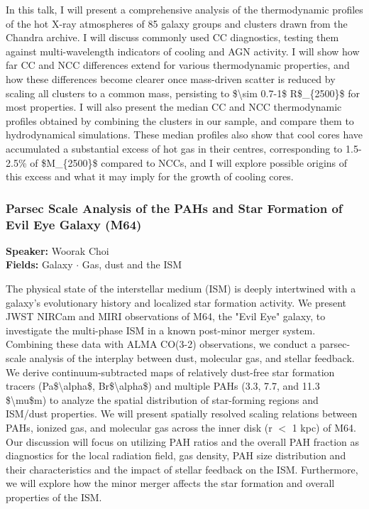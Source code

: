 In this talk, I will present a comprehensive analysis of the thermodynamic profiles of the hot X-ray atmospheres of 85 galaxy groups and clusters drawn from the Chandra archive. I will discuss commonly used CC diagnostics, testing them against multi-wavelength indicators of cooling and AGN activity. I will show how far CC and NCC differences extend for various thermodynamic properties, and how these differences become clearer once mass-driven scatter is reduced by scaling all clusters to a common mass, persisting to \$\textbackslash{}sim 0.7-1\$ R\$\_\{2500\}\$ for most properties. I will also present the median CC and NCC thermodynamic profiles obtained by combining the clusters in our sample, and compare them to hydrodynamical simulations. These median profiles also show that cool cores have accumulated a substantial excess of hot gas in their centres, corresponding to 1.5-2.5\% of \$M\_\{2500\}\$ compared to NCCs, and I will explore possible origins of this excess and what it may imply for the growth of cooling cores.

\hypertarget{abstract-talk-160}{}\label{abstract-page-talk-160}
\subsubsection*{Parsec Scale Analysis of the PAHs and Star Formation of Evil Eye Galaxy (M64)}
\textbf{Speaker:} Woorak Choi\\
\textbf{Fields:} Galaxy $\cdot$ Gas, dust and the ISM

The physical state of the interstellar medium (ISM) is deeply intertwined with a galaxy's evolutionary history and localized star formation activity. We present JWST NIRCam and MIRI observations of M64, the "Evil Eye" galaxy, to investigate the multi-phase ISM in a known post-minor merger system. Combining these data with ALMA CO(3-2) observations, we conduct a parsec-scale analysis of the interplay between dust, molecular gas, and stellar feedback. We derive continuum-subtracted maps of relatively dust-free star formation tracers (Pa\$\textbackslash{}alpha\$, Br\$\textbackslash{}alpha\$) and multiple PAHs (3.3, 7.7, and 11.3 \$\textbackslash{}mu\$m) to analyze the spatial distribution of star-forming regions and ISM/dust properties. We will present spatially resolved scaling relations between PAHs, ionized gas, and molecular gas across the inner disk (r $<$ 1 kpc) of M64. Our discussion will focus on utilizing PAH ratios and the overall PAH fraction as diagnostics for the local radiation field, gas density, PAH size distribution and their characteristics and the impact of stellar feedback on the ISM. Furthermore, we will explore how the minor merger affects the star formation and overall properties of the ISM.

